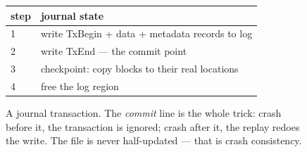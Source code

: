 \begin{figure}[htbp]
\centering
\begin{tabular}{ll}
\toprule
step & journal state \\
\midrule
1 & write TxBegin + data + metadata records to log \\
2 & write TxEnd --- the commit point \\
3 & checkpoint: copy blocks to their real locations \\
4 & free the log region \\
\bottomrule
\end{tabular}
\caption{A journal transaction. The \emph{commit} line is the
whole trick: crash before it, the transaction is ignored; crash
after it, the replay redoes the write. The file is never
half-updated --- that is crash consistency.}
\label{fig:journal14}
\end{figure}
